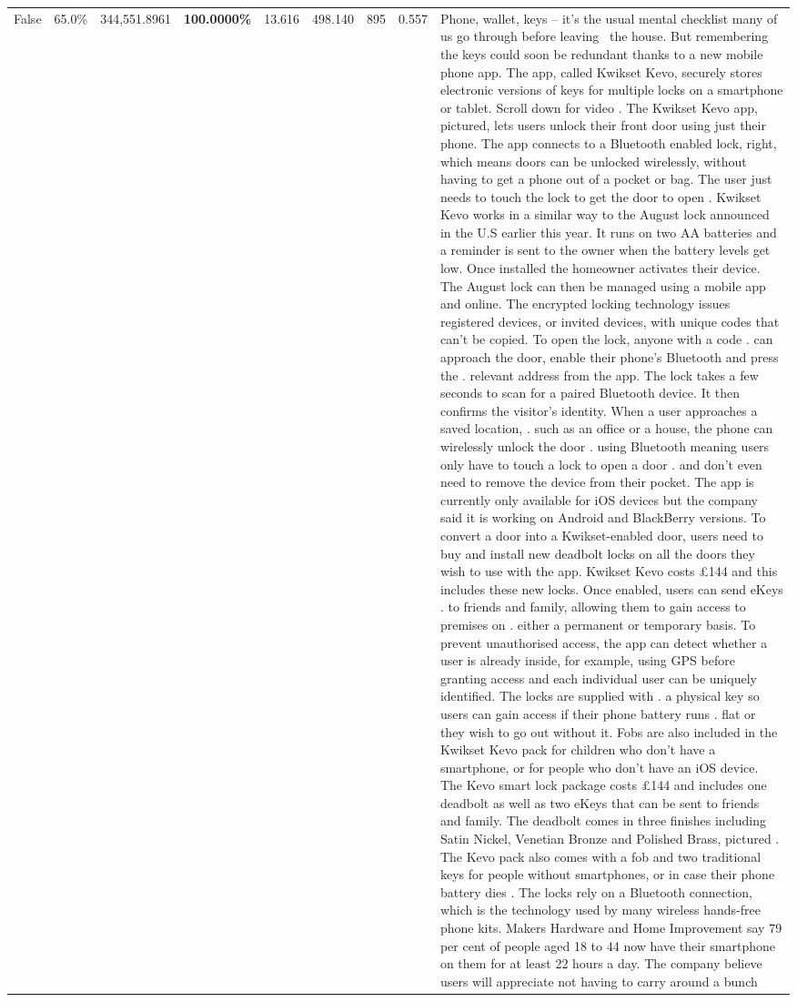 \begin{table}[H]
\begin{tabular}{lllrlllll}
False & 65.0\% & 344,551.8961 & \bfseries \color{red} 100.0000\% & 13.616 & 498.140 & 895 & 0.557 & Phone, wallet, keys – it’s the usual mental checklist many of us go through before leaving  the house. But remembering the keys could soon be redundant thanks to a new mobile phone app. The app, called Kwikset Kevo, securely stores electronic versions of keys for multiple locks on a smartphone or tablet. Scroll down for video . The Kwikset Kevo app, pictured, lets users unlock their front door using just their phone. The app connects to a Bluetooth enabled lock, right, which means doors can be unlocked wirelessly, without having to get a phone out of a pocket or bag. The user just needs to touch the lock to get the door to open . Kwikset Kevo works in a similar way to the August lock announced in the U.S earlier this year. It runs on two AA batteries and a reminder is sent to the owner when the battery levels get low. Once installed the homeowner activates their device. The August lock can then be managed using a mobile app and online. The encrypted locking technology issues registered devices, or invited devices, with unique codes that can't be copied. To open the lock, anyone with a code . can approach the door, enable their phone's Bluetooth and press the . relevant address from the app. The lock takes a few seconds to scan for a paired Bluetooth device. It then confirms the visitor's identity. When a user approaches a saved location, . such as an office or a house, the phone can wirelessly unlock the door . using Bluetooth meaning users only have to touch a lock to open a door . and don't even need to remove the device from their pocket. The app is currently only available for iOS devices but the company said it is working on Android and BlackBerry versions. To convert a door into a Kwikset-enabled door, users need to buy and install new deadbolt locks on all the doors they wish to use with the app. Kwikset Kevo costs £144 and this includes these new locks. Once enabled, users can send eKeys . to friends and family, allowing them to gain access to premises on . either a permanent or temporary basis. To prevent unauthorised access, the app can detect whether a user is already inside, for example, using GPS before granting access and each individual user can be uniquely identified. The locks are supplied with . a physical key so users can gain access if their phone battery runs . flat or they wish to go out without it. Fobs are also included in the Kwikset Kevo pack for children who don't have a smartphone, or for people who don't have an iOS device. The Kevo smart lock package costs £144 and includes one deadbolt as well as two eKeys that can be sent to friends and family. The deadbolt comes in three finishes including Satin Nickel, Venetian Bronze and Polished Brass, pictured . The Kevo pack also comes with a fob and two traditional keys for people without smartphones, or in case their phone battery dies . The locks rely on a Bluetooth connection, which is the technology used by many wireless hands-free phone kits. Makers Hardware and Home Improvement say 79 per cent of people aged 18 to 44 now have their smartphone on them for at least 22 hours a day. The company believe users will appreciate not having to carry around a bunch 
\end{tabular}
\end{table}
